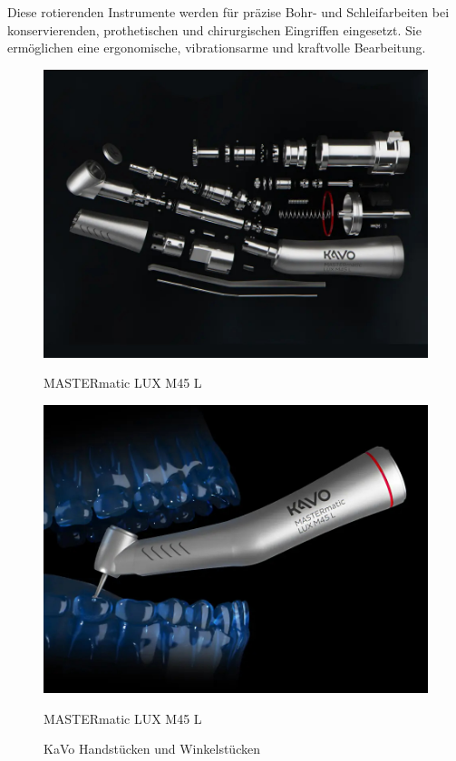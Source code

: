 Diese rotierenden Instrumente werden für präzise Bohr- und Schleifarbeiten bei konservierenden, prothetischen und chirurgischen Eingriffen eingesetzt. Sie ermöglichen eine ergonomische, vibrationsarme und kraftvolle Bearbeitung.

\begin{figure}[H]
  \centering
  \begin{minipage}[b]{0.45\textwidth}
    \centering
    \includegraphics[width=\textwidth]{images/matermatic.jpg}
    \caption*{MASTERmatic LUX M45 L}
  \end{minipage}
  \hspace{0.05\textwidth}
  \begin{minipage}[b]{0.45\textwidth}
    \centering
    \includegraphics[width=\textwidth]{images/mastermatic2.jpg}
    \caption*{MASTERmatic LUX M45 L}
  \end{minipage}
  \caption{KaVo Handstücken und Winkelstücken}
  \label{fig:handstuecke}
\end{figure}
\vspace{1em}

